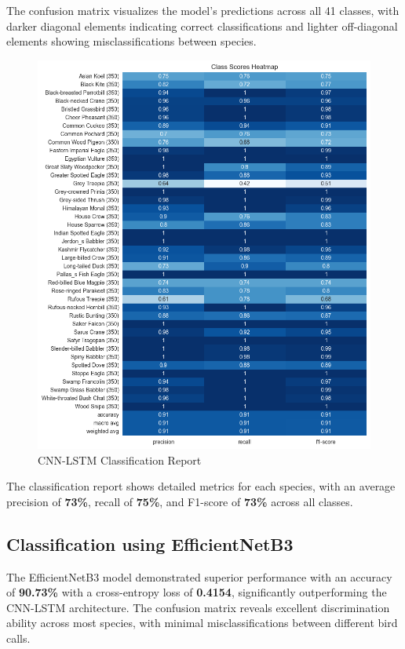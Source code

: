 The confusion matrix visualizes the model's predictions across all 41 classes, with darker diagonal elements indicating correct classifications and lighter off-diagonal elements showing misclassifications between species.

\begin{figure}[h!]
      \centering
      \includegraphics[scale=0.6]{images/efficientNet_classification_report.png}
      \caption{CNN-LSTM Classification Report}
  \end{figure}
  \newpage
The classification report shows detailed metrics for each species, with an average precision of \textbf{73\%}, recall of \textbf{75\%}, and F1-score of \textbf{73\%} across all classes.


\newpage
\subsection{Classification using EfficientNetB3}
The EfficientNetB3 model demonstrated superior performance with an accuracy of \textbf{90.73\%} with a cross-entropy loss of \textbf{0.4154}, significantly outperforming the CNN-LSTM architecture. The confusion matrix reveals excellent discrimination ability across most species, with minimal misclassifications between different bird calls.

